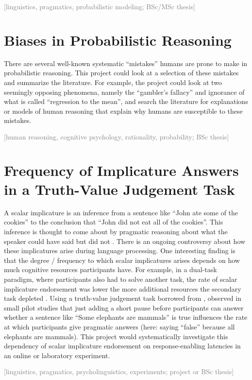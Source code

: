 \documentclass[fleqn,reqno,10pt]{article}
\newcommand{\scope}[1]{\hfill\textcolor{gray}{[#1]}}
\begin{document}
\scope{linguistics, pragmatics, probabilistic modeling; BSc/MSc thesis}


\section{Biases in Probabilistic Reasoning}

There are several well-known systematic ``mistakes'' humans are prone to make in probabilistic
reasoning. This project could look at a selection of these mistakes and summarize the
literature. For example, the project could look at two seemingly opposing phenomena, namely the
``gambler's fallacy'' and ignorance of what is called ``regression to the mean'', and search
the literature for explanations or models of human reasoning that explain why humans are
susceptible to these mistakes. 

\scope{human reasoning, cognitive psychology, rationality, probability; BSc thesis}


\section{Frequency of Implicature Answers in a Truth-Value Judgement Task}

A scalar implicature is an inference from a sentence like ``John ate some of the cookies'' to
the conclusion that ``John did not eat all of the cookies''. This inference is thought to come
about by pragmatic reasoning about what the speaker could have said but did not
\citep[e.g.][]{Geurts2010:Quantity-Implic}. There is an ongoing controversy about how these
implicatures arise during language processing. One interesting finding is that the degree /
frequency to which scalar implicatures arises depends on how much cognitive resources
participants have. For example, in a dual-task paradigm, where participants also had to solve
another task, the rate of scalar implicature endorsement was lower the more additional
resources the secondary task depleted \citep{NeysDe-NeysSchaeken2007:When-People-Are}. Using a
truth-value judgement task borrowed from \citet{Noveck2001:When-Children-a},
\citet{FrankeDulcinati2019:Strategies-of-d} observed in small pilot studies that just adding a
short pause before participants can answer whether a sentence like ``Some elephants are
mammals'' is true influences the rate at which participants give pragmatic answers (here:
saying ``false'' because all elephants are mammals). This project would systematically
investigate this dependency of scalar implicature endorsement on response-enabling latencies in
an online or laboratory experiment. 

\scope{linguistics, pragmatics, psycholinguistics, experiments; project or BSc thesis}

\printbibliography[heading=bibintoc]
\end{document}
